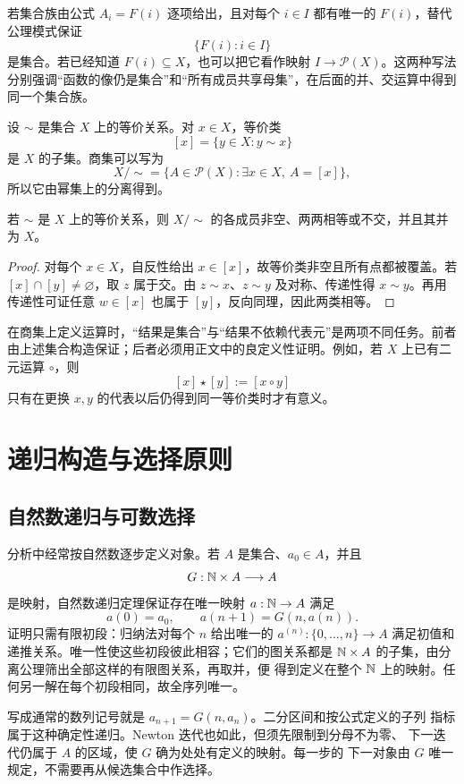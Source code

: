 若集合族由公式 \(A_i=F(i)\) 逐项给出，且对每个 \(i\in I\) 都有唯一的 \(F(i)\)，替代公理模式保证
\[
  \{F(i):i\in I\}
\]
是集合。若已经知道 \(F(i)\subseteq X\)，也可以把它看作映射
\(I\to\mathcal P(X)\)。这两种写法分别强调“函数的像仍是集合”和“所有成员共享母集”，在后面的并、交运算中得到同一个集合族。

设 \(\sim\) 是集合 \(X\) 上的等价关系。对 \(x\in X\)，等价类
\[
 [x]=\{y\in X:y\sim x\}
\]
是 \(X\) 的子集。商集可以写为
\[
 X/{\sim}
 =
 \{A\in\mathcal P(X):\exists x\in X,\ A=[x]\},
\]
所以它由幂集上的分离得到。

\begin{proposition}[商集确为分割]
若 \(\sim\) 是 \(X\) 上的等价关系，则 \(X/{\sim}\) 的各成员非空、两两相等或不交，并且其并为 \(X\)。
\end{proposition}

\begin{proof}
对每个 \(x\in X\)，自反性给出 \(x\in[x]\)，故等价类非空且所有点都被覆盖。若 \([x]\cap[y]\ne\varnothing\)，取 \(z\) 属于交。由 \(z\sim x\)、\(z\sim y\) 及对称、传递性得 \(x\sim y\)。再用传递性可证任意 \(w\in[x]\) 也属于 \([y]\)，反向同理，因此两类相等。
\end{proof}

在商集上定义运算时，“结果是集合”与“结果不依赖代表元”是两项不同任务。前者由上述集合构造保证；后者必须用正文中的良定义性证明。例如，若 \(X\) 上已有二元运算 \(\circ\)，则
\[
 [x]\star[y]:=[x\circ y]
\]
只有在更换 \(x,y\) 的代表以后仍得到同一等价类时才有意义。

\section{递归构造与选择原则}

\subsection{自然数递归与可数选择}

分析中经常按自然数逐步定义对象。若 \(A\) 是集合、\(a_0\in A\)，并且
\[
  G:\mathbb{N}\times A\longrightarrow A
\]
是映射，自然数递归定理保证存在唯一映射 \(a:\mathbb{N}\to A\) 满足
\[
  a(0)=a_0,\qquad a(n+1)=G(n,a(n)).
\]
证明只需有限初段：归纳法对每个 \(n\) 给出唯一的 \(a^{(n)}:\{0,\ldots,n\}\to A\)
满足初值和递推关系。唯一性使这些初段彼此相容；它们的图关系都是
\(\mathbb{N}\times A\) 的子集，由分离公理筛出全部这样的有限图关系，再取并，便
得到定义在整个 \(\mathbb{N}\) 上的映射。任何另一解在每个初段相同，故全序列唯一。

写成通常的数列记号就是 \(a_{n+1}=G(n,a_n)\)。二分区间和按公式定义的子列
指标属于这种确定性递归。Newton 迭代也如此，但须先限制到分母不为零、
下一迭代仍属于 \(A\) 的区域，使 \(G\) 确为处处有定义的映射。每一步的
下一对象由 \(G\) 唯一规定，不需要再从候选集合中作选择。

